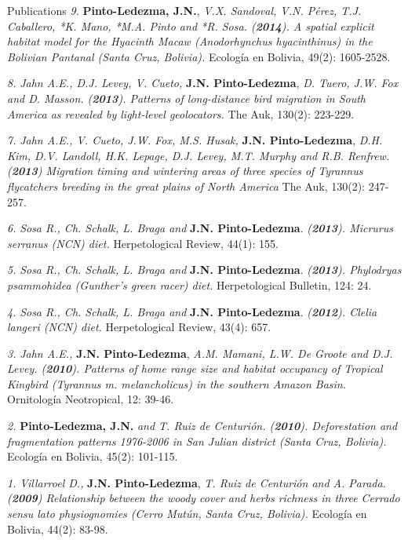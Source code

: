 \documentclass{resume} %
\begin{document}
\begin{rSection}{Publications}
{\em 9.} {\bf{Pinto-Ledezma, J.N.}}, {\em V.X. Sandoval, V.N. Pérez, T.J. Caballero, *K. Mano, *M.A. Pinto and *R. Sosa. ({{\bf 2014}}). A spatial explicit habitat model for the Hyacinth Macaw ({\em Anodorhynchus hyacinthinus}) in the Bolivian Pantanal (Santa Cruz, Bolivia).} {Ecología en Bolivia, 49(2): 1605-2528}.

{\em 8.} {\em Jahn A.E., D.J. Levey, V. Cueto,} {\bf{J.N. Pinto-Ledezma}}, {\em D. Tuero, J.W. Fox and D. Masson. ({{\bf 2013}}). Patterns of long-distance bird migration in South America as revealed by light-level geolocators.} {The Auk, 130(2): 223-229}. 

{\em 7.} {\em Jahn A.E., V. Cueto, J.W. Fox, M.S. Husak,} {\bf{J.N. Pinto-Ledezma}}, {\em D.H. Kim, D.V. Landoll, H.K. Lepage, D.J. Levey, M.T. Murphy and R.B. Renfrew. ({{\bf 2013}}) Migration timing and wintering areas of three species of Tyrannus flycatchers breeding in the great plains of North America} {The Auk, 130(2): 247-257}. 

{\em 6.} {\em *Sosa R., Ch. Schalk, L. Braga and} {\bf{J.N. Pinto-Ledezma}}. {\em ({{\bf 2013}}). {\em Micrurus serranus} (NCN) diet.} {Herpetological Review, 44(1): 155}. 

{\em 5.} {\em *Sosa R., Ch. Schalk, L. Braga and} {\bf{J.N. Pinto-Ledezma}}. {\em ({{\bf 2013}}). {\em Phylodryas psammohidea} (Gunther's green racer) diet.} {Herpetological Bulletin, 124: 24}. 

{\em 4.} {\em *Sosa R., Ch. Schalk, L. Braga and} {\bf{J.N. Pinto-Ledezma}}. {\em ({{\bf 2012}}). {\em Clelia langeri} (NCN) diet.} {Herpetological Review, 43(4): 657}. 

{\em 3.} {\em Jahn A.E.,} {\bf{J.N. Pinto-Ledezma}}, {\em A.M. Mamani, L.W. De Groote and D.J. Levey. ({{\bf 2010}}). Patterns of home range size and habitat occupancy of Tropical Kingbird ({\em Tyrannus m. melancholicus}) in the southern Amazon Basin.} {Ornitología Neotropical, 12: 39-46}. 

{\em 2.} {\bf{Pinto-Ledezma, J.N.}} {\em and T. Ruiz de Centurión. ({{\bf 2010}}). Deforestation and fragmentation patterns 1976-2006 in San Julian district (Santa Cruz, Bolivia).} {Ecología en Bolivia, 45(2): 101-115}.

{\em 1.} {\em Villarroel D.,} {\bf{J.N. Pinto-Ledezma}}, {\em T. Ruiz de Centurión and A. Parada. ({{\bf 2009}}) Relationship between the woody cover and herbs richness in three Cerrado {\em sensu lato} physiognomies (Cerro Mutún, Santa Cruz, Bolivia).} {Ecología en Bolivia, 44(2): 83-98}. 


\end{rSection}
\end{document}
